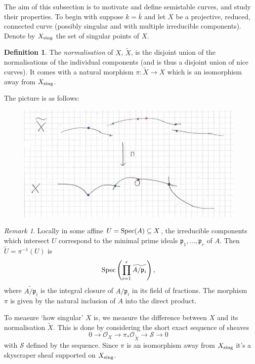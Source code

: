 \documentclass[12pt]{amsart}
\numberwithin{equation}{section}
\theoremstyle{remark}
\newtheorem{remark}[equation]{Remark}
\theoremstyle{definition}
\theoremstyle{definition}
\theoremstyle{definition}
\newtheorem{defi}[equation]{Definition}
\theoremstyle{definition}
\theoremstyle{definition}
\theoremstyle{definition}
\begin{document}
The aim of this subsection is to motivate and define semistable curves, and study their properties. To begin with suppose $k=\bar{k}$ and let $X$ be a projective, reduced, connected curve (possibly singular and with multiple irreducible components). Denote by $X_\textup{sing}$ the set of singular points of $X$.

\begin{defi}
The \textit{normalisation} of $X$, $\tilde{X}$, is the disjoint union of the normalisations of the individual components (and is thus a disjoint union of nice curves). It comes with a natural morphism $\pi:\tilde{X}\rightarrow X$ which is an isomorphism away from $X_\textup{sing}$. 
\end{defi}


The picture is as follows:

\begin{figure} [!htb] 
\includegraphics[angle=0,scale=0.5]{normalisation}
\end{figure}

\begin{remark}
Locally in some affine $U=\textup{Spec}(A)\subseteq X$, the irreducible components which intersect $U$ correspond to the minimal prime ideals $\mathfrak{p}_1,...,\mathfrak{p}_r$ of $A$. Then $\tilde{U}=\pi^{-1}(U)$ is
\[\textup{Spec}\left(\prod_{i=1}^r \widetilde{A/\mathfrak{p}_i}\right),\]
where $\widetilde{A/\mathfrak{p}_i}$ is the integral closure of $A/\mathfrak{p}_i$ in its field of fractions. The morphism $\pi$ is  given by the natural inclusion of $A$ into the direct product.
\end{remark}

To measure `how singular' $X$ is, we measure the difference between $X$ and its normalisation $\tilde{X}$. This is done by considering the short exact sequence of sheaves
\begin{equation} \label{first sheaf seq}
0\longrightarrow \mathcal{O}_X\longrightarrow \pi_*\mathcal{O}_{\tilde{X}}\longrightarrow \mathcal{S}\longrightarrow 0
\end{equation}
with $\mathcal{S}$ defined by the sequence. Since $\pi$ is an isomorphism away from $X_\textup{sing}$ it's a skyscraper sheaf supported on $X_\textup{sing}$. 
\end{document}
